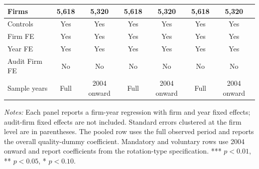 \documentclass[10pt]{article}
\begin{document}
\begin{minipage}{19cm}
\begin{threeparttable}
\begin{tabular}{l cc cc cc}
Firms & 5,618 & 5,320 & 5,618 & 5,320 & 5,618 & 5,320 \\
\midrule
Controls & Yes & Yes & Yes & Yes & Yes & Yes \\
Firm FE & Yes & Yes & Yes & Yes & Yes & Yes \\
Year FE & Yes & Yes & Yes & Yes & Yes & Yes \\
Audit Firm FE & No & No & No & No & No & No \\
Sample years & Full & 2004 onward & Full & 2004 onward & Full & 2004 onward \\
\bottomrule
\end{tabular}
\begin{tablenotes}\fontsize{9}{11}\selectfont
\item \fontsize{9}{11}\selectfont \textit{Notes:} Each panel reports a firm-year regression with firm and year fixed effects; audit-firm fixed effects are not included. Standard errors clustered at the firm level are in parentheses. The pooled row uses the full observed period and reports the overall quality-dummy coefficient. Mandatory and voluntary rows use 2004 onward and report coefficients from the rotation-type specification. *** \(p<0.01\), ** \(p<0.05\), * \(p<0.10\).
\end{tablenotes}
\end{threeparttable}

\end{minipage}
\end{document}
